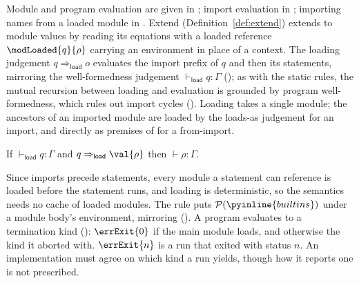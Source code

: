 Module and program evaluation are given in ; import evaluation in ; importing names from a loaded module in
. Extend (Definition~\ref{def:extend}) extends to module values by reading its equations with a loaded reference $\modLoaded{q}{\rho}$ carrying an environment in place of a context. The loading judgement $q \Rightarrow_{\mathsf{load}} o$ evaluates the import prefix
of $q$ and then its statements, mirroring the well-formedness judgement $\vdash_{\mathsf{load}} q : \Gamma$
(); as with the static rules, the mutual
recursion between loading and evaluation is grounded by program well-formedness, which rules out
import cycles ().
Loading takes a single module; the ancestors of an imported module are loaded by the
loads-as judgement for an import, and directly as premises of  for a
from-import.

 \begin{theorem}
If $\vdash_{\mathsf{load}} q : \Gamma$ and $q \Rightarrow_{\mathsf{load}} \val{\rho}$ then $\vdash \rho : \Gamma$.
\end{theorem}

\noindent Since
imports precede statements, every module a statement can reference is loaded before the statement runs, and
loading is deterministic, so the semantics needs no cache
of loaded modules. The rule  puts $\mathcal{P}(\pyinline{builtins})$ under a module
body's environment, mirroring  ().
A program evaluates to a termination kind (): $\errExit{0}$ if the main module
loads, and otherwise the kind it aborted with. $\errExit{n}$ is a run that exited with status $n$. An implementation must agree on which kind a run yields, though how it
reports one is not prescribed.



